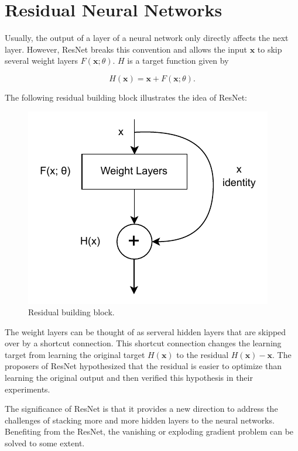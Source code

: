 \documentclass[
	parskip, 			   %
	twoside, 			   %
	DIV=14, 			   %
	BCOR=15.0mm, 		   %
	headsepline, 		   %
	open=right, 		   %
	captions=tableheading, %
	bibliography=totoc,    %
	numbers=noenddot       %
]{scrreprt}
\begin{document}
\section{Residual Neural Networks}
Usually, the output of a layer of a neural network only directly affects the next layer. However, ResNet breaks this convention and allows the input $\mathbf{x}$ to skip several weight layers $F(\mathbf{x};\theta)$. $H$ is a target function given by

\begin{equation}
    \label{eq:ResNet}
    H(\mathbf{x})=\mathbf{x}+F(\mathbf{x};\theta).
\end{equation}

The following residual building block illustrates the idea of ResNet:

\clearpage
\begin{figure}[htbp!]
    \centering
    \includegraphics[scale=1]{figures/ResNet.pdf}
    \caption{Residual building block.}
    \label{fig:ResNet}
\end{figure}

The weight layers can be thought of as serveral hidden layers that are skipped over by a shortcut connection. This shortcut connection changes the learning target from learning the original target $H(\mathbf{x})$ to the residual $H(\mathbf{x})-\mathbf{x}$. The proposers of ResNet hypothesized that the residual is easier to optimize than learning the original output and then verified this hypothesis in their experiments. 

 The significance of ResNet is that it provides a new direction to address the challenges of stacking more and more hidden layers to the neural networks. Benefiting from the ResNet, the vanishing or exploding gradient problem can be solved to some extent.
\end{document}
